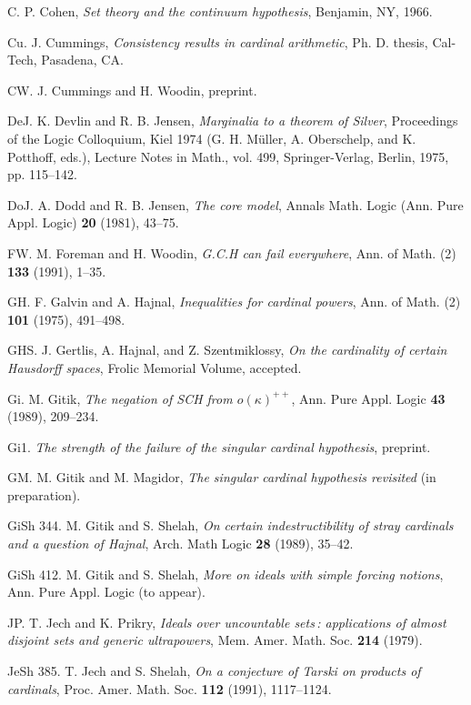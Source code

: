 \REF C. P. Cohen, {\it Set theory and the continuum 
hypothesis},
Benjamin, NY, 1966.
 
 \REF Cu. J. Cummings,  {\it   Consistency results in
 cardinal arithmetic\/}, Ph. D. thesis, Cal-Tech,
Pasadena, CA.
 
\REF CW. J. Cummings and H. Woodin,   preprint.
 
\REF DeJ. K. Devlin and R. B. Jensen, {\it Marginalia to a 
theorem of
Silver\/}, Proceedings of the Logic Colloquium, Kiel
1974 (G. H. M\"uller, A. Oberschelp, and K. Potthoff, 
eds.),  Lecture
Notes in Math., vol. 
499, Springer-Verlag, Berlin, 1975, pp. 115--142.
 
\REF DoJ. A. Dodd and R. B. Jensen, {\it The core 
model\/}, Annals Math.
Logic (Ann. Pure Appl. Logic) {\bf 20} (1981), 43--75.
 
\REF FW. M. Foreman and H. Woodin, {\it G.C.H can fail
everywhere\/}, Ann. of Math. (2) {\bf 133} (1991), 1--35.
 
\REF GH. F. Galvin and A. Hajnal, {\it Inequalities for 
cardinal
powers\/}, Ann. of  Math. (2) {\bf 101} (1975), 491--498.
 
\REF GHS. J. Gertlis, A. Hajnal, and Z. Szentmiklossy, 
{\it On the
cardinality of certain Hausdorff spaces\/},
Frolic Memorial Volume, accepted.
 
\REF Gi. M. Gitik, {\it The negation of SCH from 
$o(\kappa)^{++}$},
Ann. Pure Appl. Logic {\bf 43} (1989), 209--234.
 
\REF Gi1. {\Bysame} {\it The strength of the failure of the
 singular cardinal hypothesis\/}, preprint.
 
\REF GM.  M. Gitik and M. Magidor, {\it The singular 
cardinal
 hypothesis revisited\/} (in preparation).
 
\REF GiSh 344. M. Gitik and S. Shelah, {\it On certain 
indestructibility
 of stray cardinals and a question of Hajnal\/}, Arch. 
Math Logic
  {\bf 28} (1989), 35--42.
 
\REF GiSh 412. M. Gitik and S. Shelah,
{\it More on ideals with simple forcing notions\/},
Ann. Pure Appl. Logic (to appear).
 
\REF JP. T. Jech and K. Prikry, {\it Ideals over 
uncountable sets\,\RM:
applications of almost disjoint sets and generic 
ultrapowers\/}, 
Mem. Amer.
Math. Soc.  {\bf 214} (1979).
 
\REF JeSh 385.  T. Jech and S. Shelah, {\it On 
a conjecture of Tarski on products of cardinals\/},
Proc. Amer. Math. Soc. {\bf112} (1991), 1117--1124.
 
